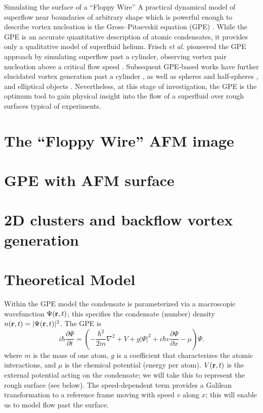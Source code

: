 \begin{chapter}{\label{cha:afm}Simulating the surface of a ``Floppy Wire''}
A practical dynamical model of superflow near boundaries of arbitrary
shape which is powerful enough to describe vortex nucleation is
the Gross--Pitaevskii equation (GPE) \cite{RobertsBerloff}.  While the GPE is an accurate quantitative description of atomic condensates, it provides only a qualitative model of superfluid helium.  Frisch {\it et al.} pioneered the GPE approach by simulating superflow past a cylinder, observing vortex pair nucleation above a critical flow speed \cite{Frisch1992}.  Subsequent GPE-based works have further elucidated vortex generation past a cylinder \cite{Cylinder}, as well as spheres and half-spheres \cite{Sphere}, and elliptical objects \cite{Ellipse}.    Nevertheless, at this stage of investigation, the GPE is the optimum tool 
to gain physical insight into the flow of a superfluid over
rough surfaces typical of experiments.
\section{\label{section:afmimage} The ``Floppy Wire'' AFM image}
\section{\label{section:gpeafm} GPE with AFM surface}
\section{\label{section:2dafm} 2D clusters and backflow vortex generation}
\section{Theoretical Model}
Within the GPE model the condensate is parameterized via a macroscopic wavefunction $\Psi({\bf r},{t})$; this specifies the condensate (number) density $n({\bf r},{t})=|\Psi({\bf r},{t})|^2$.  The GPE is
\begin{equation}
i \hbar \frac{\partial\Psi}{\partial t} 
= \left(-\frac{\hbar^2}{2m}\nabla^2 + V + g|\Psi|^2 + i \hbar v \frac{\partial \Psi}{\partial x} - \mu \right) \Psi.
\label{eq:gpe1}
\end{equation}
\noindent
where $m$ is the mass of one atom, $g$ is a coefficient that characterizes the atomic interactions, and $\mu$ is the chemical potential (energy
per atom).  $V({\bf r},t)$ is the external potential acting on the condensate; we will take this to represent the rough surface (see below).  The speed-dependent term provides a Galilean transformation to a reference frame moving with speed $v$ along $x$; this will enable us to model flow past the surface.


\end{chapter}
